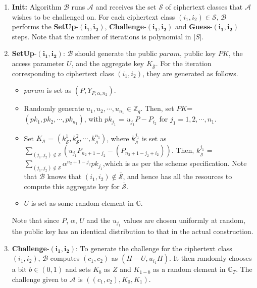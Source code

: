 \begin{enumerate}
 \item \textbf{Init:} Algorithm $\mathcal{B}$ runs $\mathcal{A}$ and receives the set $\mathcal{S}$ of ciphertext classes that $\mathcal{A}$ wishes to be challenged on. For each ciphertext class $(i_1,i_2)\in\mathcal{S}$, $\mathcal{B}$ performs the \textbf{SetUp}-$\mathbf{(i_1,i_2)}$, \textbf{Challenge}-$\mathbf{(i_1,i_2)}$ and \textbf{Guess}-$\mathbf{(i_1,i_2)}$ steps. Note that the number of iterations is polynomial in $|S|$. 
 
 \item \textbf{SetUp}-$\mathbf{(i_1,i_2)}$: $\mathcal{B}$ should generate the public $param$, public key $PK$, the access parameter $U$, and the aggregate key $K_{\overline{\mathcal{S}}}$. For the iteration corresponding to ciphertext class $(i_1,i_2)$, they are generated as follows.
 \begin{itemize}
  \item $param$ is set as $(P,Y_{P,\alpha,n_2})$.
  \item Randomly generate $u_1,u_2,\cdots,u_{n_1} \in \mathbb{Z}_q$. Then, set $PK$= $(pk_1,pk_2,\cdots,pk_{n_1})$, with $pk_{j_1}$ = $u_{j_1}P - P_{i_2}$ for $j_1=1,2,\cdots,n_1$.
  \item Set $K_{\overline{\mathcal{S}}}$ = $(k^{1}_{\overline{\mathcal{S}}},k^{2}_{\overline{\mathcal{S}}},\cdots,k^{n_1}_{\overline{\mathcal{S}}})$, where $k^{j_1}_{\overline{\mathcal{S}}}$ is set as $\sum_{(j_1,j_2)\notin\mathcal{S}}({u_{j_1}}P_{n_2+1-j_2}-(P_{n_2+1-j_2+i_2}))$. Then, $k^{j_1}_{\overline{\mathcal{S}}}$ = $\sum_{(j_1,j_2)\notin\mathcal{S}}\alpha^{n_2+1-j_2}pk_{j_1}$,which is as per the scheme specification. Note that $\mathcal{B}$ knows that $(i_1,i_2)\notin \overline{\mathcal{S}}$, and hence has all the resources to compute this aggregate key for $\overline{\mathcal{S}}$. 
  \item $U$ is set as some random element in $\mathbb{G}$.
 \end{itemize}
 
 Note that since $P$, $\alpha$, $U$ and the $u_{j_1}$ values are chosen uniformly at random, the public key has an identical distribution to that in the actual construction.
 
 \item \textbf{Challenge}-$\mathbf{(i_1,i_2)}$: To generate the challenge for the ciphertext class $(i_1,i_2)$, $\mathcal{B}$ computes $(c_1,c_2)$ as $(H-U,u_{i_1}H)$. It then randomly chooses a bit $b\in{(0,1)}$ and sets $K_b$ as $Z$ and $K_{1-b}$ as a random element in $\mathbb{G}_T$. The challenge given to $\mathcal{A}$ is $((c_1,c_2),K_0,K_1)$. 
 

\end{enumerate}
